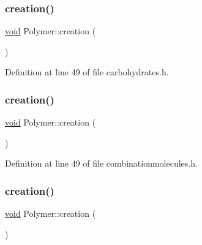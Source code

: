 \subsubsection{\texorpdfstring{creation()}{creation()}\hspace{0.1cm}{\footnotesize\ttfamily [1/10]}}
{\footnotesize\ttfamily \mbox{\hyperlink{glad_8h_a950fc91edb4504f62f1c577bf4727c29}{void}} Polymer\+::creation (\begin{DoxyParamCaption}{ }\end{DoxyParamCaption})\hspace{0.3cm}{\ttfamily [inline]}}



Definition at line 49 of file carbohydrates.\+h.

\mbox{\label{class_polymer_a1daba3eb2ba8428bf2f3e814668b155f}} 
\subsubsection{\texorpdfstring{creation()}{creation()}\hspace{0.1cm}{\footnotesize\ttfamily [2/10]}}
{\footnotesize\ttfamily \mbox{\hyperlink{glad_8h_a950fc91edb4504f62f1c577bf4727c29}{void}} Polymer\+::creation (\begin{DoxyParamCaption}{ }\end{DoxyParamCaption})\hspace{0.3cm}{\ttfamily [inline]}}



Definition at line 49 of file combinationmolecules.\+h.

\mbox{\label{class_polymer_a1daba3eb2ba8428bf2f3e814668b155f}} 
\subsubsection{\texorpdfstring{creation()}{creation()}\hspace{0.1cm}{\footnotesize\ttfamily [3/10]}}
{\footnotesize\ttfamily \mbox{\hyperlink{glad_8h_a950fc91edb4504f62f1c577bf4727c29}{void}} Polymer\+::creation (\begin{DoxyParamCaption}{ }\end{DoxyParamCaption})\hspace{0.3cm}{\ttfamily [inline]}}




